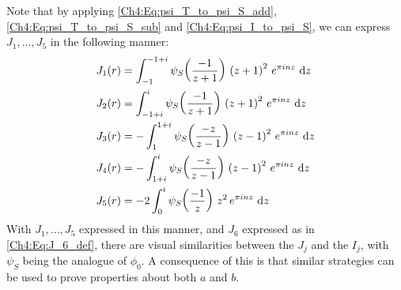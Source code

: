 Note that by applying \eqref{Ch4:Eq:psi_T_to_psi_S_add}, \eqref{Ch4:Eq:psi_T_to_psi_S_sub} and \eqref{Ch4:Eq:psi_I_to_psi_S}, we can express $J_1, \ldots, J_5$ in the following manner:
\begin{align}
    J_1(r) &= \int_{-1}^{-1 + i} \psi_S\of{\frac{-1}{z + 1}} \, \parenth{z + 1}^2 \, e^{\pi i n z} \, \diff{z} \label{Ch4:Eq:J1_like_I1} \\
    J_2(r) &= \int_{-1 + i}^{i} \psi_S\of{\frac{-1}{z + 1}} \, \parenth{z + 1}^2 \, e^{\pi i n z} \, \diff{z} \label{Ch4:Eq:J2_like_I2} \\
    J_3(r) &= -\int_{1}^{1 + i} \psi_S\of{\frac{-z}{z - 1}} \, \parenth{z - 1}^2 \, e^{\pi i n z} \, \diff{z} \label{Ch4:Eq:J3_like_I3} \\
    J_4(r) &= -\int_{1 + i}^{i} \psi_S\of{\frac{-z}{z - 1}} \, \parenth{z - 1}^2 \, e^{\pi i n z} \, \diff{z} \label{Ch4:Eq:J4_like_I4} \\
    J_5(r) &= -2 \int_{0}^{i} \psi_S\of{\frac{-1}{z}} \, z^2 \, e^{\pi i n z} \, \diff{z} \label{Ch4:Eq:J5_like_I5}
\end{align}
With $J_1, \ldots, J_5$ expressed in this manner, and $J_6$ expressed as in \eqref{Ch4:Eq:J_6_def}, there are visual similarities between the $J_j$ and the $I_j$, with $\psi_S$ being the analogue of $\phi_0$. A consequence of this is that similar strategies can be used to prove properties about both $a$ and $b$.